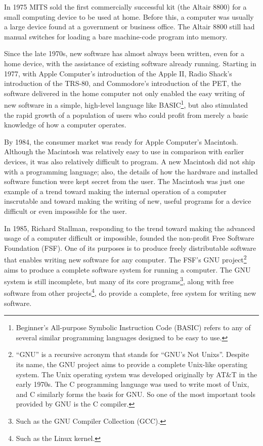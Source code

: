 \documentclass[twocolumn]{book}
\begin{document}
In 1975 MITS sold the first commercially successful kit (the Altair 8800) for a
small computing device to be used at home.  Before this, a computer was usually
a large device found at a government or business office.  The Altair 8800 still
had manual switches for loading a bare machine-code program into memory.

Since the late 1970s, new software has almost always been written, even for a
home device, with the assistance of existing software already running.
Starting in 1977, with Apple Computer's introduction of the Apple II, Radio
Shack's introduction of the TRS-80, and Commodore's introduction of the PET,
the software delivered in the home computer not only enabled the easy writing
of new software in a simple, high-level language like BASIC\footnote{%
   Beginner's All-purpose Symbolic Instruction Code (BASIC) refers to any of
   several similar programming languages designed to be easy to use.},
but also stimulated the rapid growth of a population of users who could profit
from merely a basic knowledge of how a computer operates.

By 1984, the consumer market was ready for Apple Computer's Macintosh.
Although the Macintosh was relatively easy to use in comparison with earlier
devices, it was also relatively difficult to program. A new Macintosh did not
ship with a programming language; also, the details of how the hardware and
installed software function were kept secret from the user.  The Macintosh was
just one example of a trend toward making the internal operation of a computer
inscrutable and toward making the writing of new, useful programs for a device
difficult or even impossible for the user.

In 1985, Richard Stallman, responding to the trend toward making the advanced
usage of a computer difficult or impossible, founded the non-profit Free
Software Foundation (FSF).  One of its purposes is to produce freely
distributable software that enables writing new software for any computer.  The
FSF's GNU project\footnote{%
   ``GNU'' is a recursive acronym that stands for ``GNU's Not Unixs''. Despite
   its name, the GNU project aims to provide a complete Unix-like operating
   system.  The Unix operating system was developed originally by AT\&T in the
   early 1970s. The C programming language was used to write most of Unix, and
   C similarly forms the basis for GNU.  So one of the most important tools
   provided by GNU is the C compiler.}
aims to produce a complete software system for running a computer.  The GNU
system is still incomplete, but many of its core programs\footnote{%
   Such as the GNU Compiler Collection (GCC).},
along with free software from other projects\footnote{%
   Such as the Linux kernel.},
do provide a complete, free system for writing new software.
\end{document}
